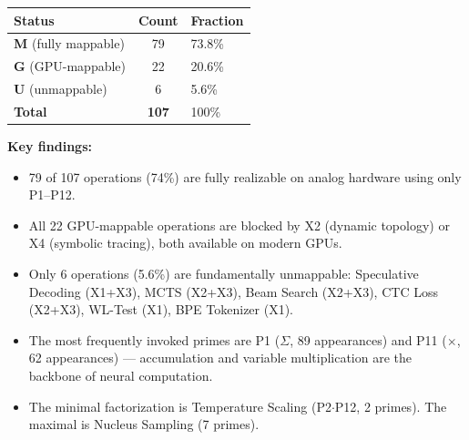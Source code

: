 \documentclass[10pt]{article}
\begin{document}
\begin{tabular}{lcl}
\toprule
Status & Count & Fraction \\
\midrule
\textbf{M} (fully mappable) & 79 & 73.8\% \\
\textbf{G} (GPU-mappable) & 22 & 20.6\% \\
\textbf{U} (unmappable) & 6 & 5.6\% \\
\midrule
\textbf{Total} & \textbf{107} & 100\% \\
\bottomrule
\end{tabular}

\bigskip
\noindent\textbf{Key findings:}
\begin{itemize}[leftmargin=*]
\item 79 of 107 operations (74\%) are fully realizable on analog hardware using only P1--P12.
\item All 22 GPU-mappable operations are blocked by X2 (dynamic topology) or X4 (symbolic tracing), both available on modern GPUs.
\item Only 6 operations (5.6\%) are fundamentally unmappable: Speculative Decoding (X1+X3), MCTS (X2+X3), Beam Search (X2+X3), CTC Loss (X2+X3), WL-Test (X1), BPE Tokenizer (X1).
\item The most frequently invoked primes are P1 ($\Sigma$, 89 appearances) and P11 ($\times$, 62 appearances) --- accumulation and variable multiplication are the backbone of neural computation.
\item The minimal factorization is Temperature Scaling (P2$\cdot$P12, 2 primes). The maximal is Nucleus Sampling (7 primes).
\end{itemize}
\end{document}
